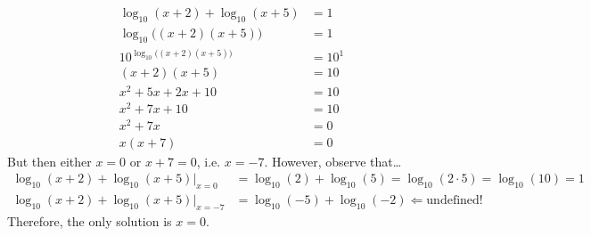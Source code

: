 \documentclass[11pt,letterpaper]{article}
\begin{document}
\sol
	\[
	\begin{aligned}
	\log_{10}(x + 2) + \log_{10}(x + 5)&= 1 \\[0.3cm]
	\log_{10}\big( (x + 2)(x + 5) \big)&= 1 \\[0.3cm]
	10^{\log_{10}\big( (x + 2)(x + 5) \big)}&= 10^1 \\[0.3cm]
	(x + 2)(x + 5)&= 10 \\[0.3cm]
	x^2 + 5x + 2x + 10&= 10 \\[0.3cm]
	x^2 + 7x + 10&= 10 \\[0.3cm]
	x^2 + 7x&= 0 \\[0.3cm]
	x(x + 7)&= 0 
	\end{aligned}
	\] \space
But then either $x= 0$ or $x + 7= 0$, i.e. $x= -7$. However, observe that\dots
	\[
	\begin{aligned}
	\log_{10}(x + 2) + \log_{10}(x + 5)\bigg|_{x= 0}&= \log_{10}(2) + \log_{10}(5)= \log_{10}(2 \cdot 5)= \log_{10}(10)= 1 \\
	\log_{10}(x + 2) + \log_{10}(x + 5) \bigg|_{x= -7}&= \log_{10}(-5) + \log_{10}(-2) \Longleftarrow \text{undefined!}
	\end{aligned}
	\] \pspace
Therefore, the only solution is $x= 0$. 


\end{document}
